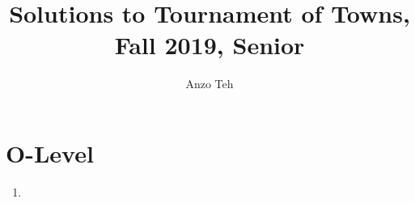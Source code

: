 \documentclass[11pt,a4paper]{article}
\begin{document}
\newcommand{\la}{\leftarrow}
\newcommand{\lra}{\leftrightarrow}
\newcommand{\bbN}{\mathbb{N}}
\newcommand{\bbZ}{\mathbb{Z}}
\newcommand{\dsum}{\displaystyle\sum}
\newcommand{\dprod}{\displaystyle\prod}


\title{Solutions to Tournament of Towns, Fall 2019, Senior}
\author{Anzo Teh}
\date{}
\maketitle

\section*{O-Level}
\begin{enumerate}
	\item
\end{enumerate}
\end{document}
